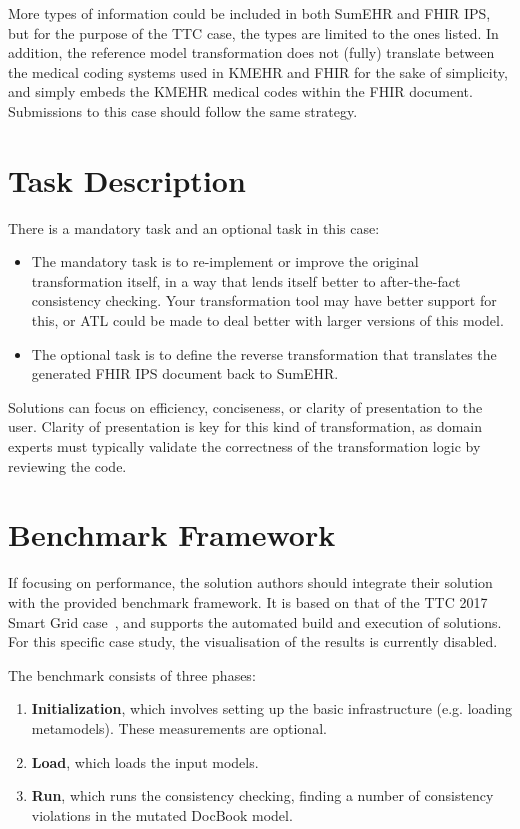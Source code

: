 \documentclass[a4paper]{scrartcl}
\begin{document}
More types of information could be included in both SumEHR and FHIR IPS, but
for the purpose of the TTC case, the types are limited to the ones listed. In
addition, the reference model transformation does not (fully) translate between
the medical coding systems used in KMEHR and FHIR for the sake of simplicity,
and simply embeds the KMEHR medical codes within the FHIR document.
Submissions to this case should follow the same strategy.

\section{Task Description}
\label{sec:task-description}

There is a mandatory task and an optional task in this case:

\begin{itemize}
\item The mandatory task is to re-implement or improve the original
  transformation itself, in a way that lends itself better to after-the-fact
  consistency checking. Your transformation tool may have better support for
  this, or ATL could be made to deal better with larger versions of this model.

\item The optional task is to define the reverse transformation that translates
  the generated FHIR IPS document back to SumEHR.
\end{itemize}

Solutions can focus on efficiency, conciseness, or clarity of presentation to
the user. Clarity of presentation is key for this kind of transformation, as
domain experts must typically validate the correctness of the transformation
logic by reviewing the code.

\section{Benchmark Framework}
\label{sec:benchmark-framework}

If focusing on performance, the solution authors should integrate their solution
with the provided benchmark framework. It is based on that of the TTC 2017 Smart
Grid case~\cite{hinkel_ttc_2017}, and supports the automated build and execution
of solutions. For this specific case study, the visualisation of the results is
currently disabled.

The benchmark consists of three phases:

\begin{enumerate}
\item \textbf{Initialization}, which involves setting up the basic
  infrastructure (e.g. loading metamodels). These measurements are optional.
\item \textbf{Load}, which loads the input models.
\item \textbf{Run}, which runs the consistency checking, finding a number of
  consistency violations in the mutated DocBook model.
\end{enumerate}
\end{document}
